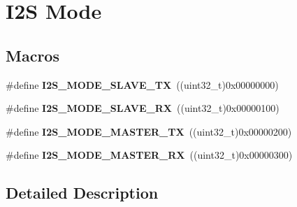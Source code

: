 \hypertarget{group___i2_s___mode}{}\section{I2S Mode}
\label{group___i2_s___mode}
\subsection*{Macros}
\begin{DoxyCompactItemize}
\item 
\#define {\bfseries I2\+S\+\_\+\+M\+O\+D\+E\+\_\+\+S\+L\+A\+V\+E\+\_\+\+TX}~((uint32\+\_\+t)0x00000000)\hypertarget{group___i2_s___mode_ga319dc7c9a746bb69bc8f0a2747b3ee0c}{}\label{group___i2_s___mode_ga319dc7c9a746bb69bc8f0a2747b3ee0c}

\item 
\#define {\bfseries I2\+S\+\_\+\+M\+O\+D\+E\+\_\+\+S\+L\+A\+V\+E\+\_\+\+RX}~((uint32\+\_\+t)0x00000100)\hypertarget{group___i2_s___mode_ga0016b5776f96b393adf00ebcfec46eb7}{}\label{group___i2_s___mode_ga0016b5776f96b393adf00ebcfec46eb7}

\item 
\#define {\bfseries I2\+S\+\_\+\+M\+O\+D\+E\+\_\+\+M\+A\+S\+T\+E\+R\+\_\+\+TX}~((uint32\+\_\+t)0x00000200)\hypertarget{group___i2_s___mode_ga2d70b3c9f774250186aa08c193f06c0d}{}\label{group___i2_s___mode_ga2d70b3c9f774250186aa08c193f06c0d}

\item 
\#define {\bfseries I2\+S\+\_\+\+M\+O\+D\+E\+\_\+\+M\+A\+S\+T\+E\+R\+\_\+\+RX}~((uint32\+\_\+t)0x00000300)\hypertarget{group___i2_s___mode_ga368748b1b6170fd660bfee81c83d1e3f}{}\label{group___i2_s___mode_ga368748b1b6170fd660bfee81c83d1e3f}

\end{DoxyCompactItemize}


\subsection{Detailed Description}
